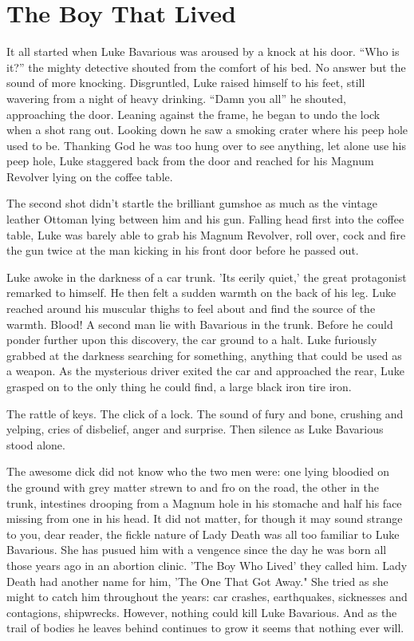 \chapter{The Boy That Lived}





It all started when Luke Bavarious was aroused by a knock at his
door. ``Who is it?'' the mighty detective shouted from the comfort of
his bed. No answer but the sound of more knocking. Disgruntled,
Luke raised himself to his feet, still wavering from a night of
heavy drinking. ``Damn you all'' he shouted, approaching the door.
Leaning against the frame, he began to undo the lock when a shot
rang out. Looking down he saw a smoking crater where his peep hole
used to be. Thanking God he was too hung over to see anything, let
alone use his peep hole, Luke staggered back from the door and
reached for his Magnum Revolver lying on the coffee table.



The second shot didn't startle the brilliant gumshoe as much as the
vintage leather Ottoman lying between him and his gun. Falling head
first into the coffee table, Luke was barely able to grab his
Magnum Revolver, roll over, cock and fire the gun twice at the man
kicking in his front door before he passed out.



Luke awoke in the darkness of a car trunk. 'Its eerily quiet,' the
great protagonist remarked to himself. He then felt a sudden warmth
on the back of his leg. Luke reached around his muscular thighs to
feel about and find the source of the warmth. Blood! A second man
lie with Bavarious in the trunk. Before he could ponder further
upon this discovery, the car ground to a halt. Luke furiously
grabbed at the darkness searching for something, anything that
could be used as a weapon. As the mysterious driver exited the car
and approached the rear, Luke grasped on to the only thing he could
find, a large black iron tire iron.



The rattle of keys. The click of a lock. The sound of fury and
bone, crushing and yelping, cries of disbelief, anger and surprise.
Then silence as Luke Bavarious stood alone.



The awesome dick did not know who the two men were: one lying
bloodied on the ground with grey matter strewn to and fro on the
road, the other in the trunk, intestines drooping from a Magnum
hole in his stomache and half his face missing from one in his
head. It did not matter, for though it may sound strange to you,
dear reader, the fickle nature of Lady Death was all too familiar
to Luke Bavarious. She has pusued him with a vengence since the day
he was born all those years ago in an abortion clinic. 'The Boy Who
Lived' they called him. Lady Death had another name for him, 'The
One That Got Away." She tried as she might to catch him throughout
the years: car crashes, earthquakes, sicknesses and contagions,
shipwrecks. However, nothing could kill Luke Bavarious. And as the
trail of bodies he leaves behind continues to grow it seems that
nothing ever will. 
 



